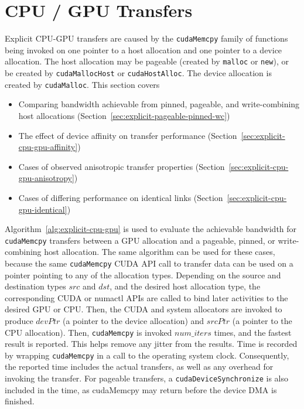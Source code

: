 \section{CPU / GPU Transfers}
\label{sec:explicit-cpu-gpu}

Explicit CPU-GPU transfers are caused by the \texttt{cudaMemcpy} family of functions being invoked on one pointer to a host allocation and one pointer to a device allocation.
The host allocation may be pageable (created by \texttt{malloc} or \texttt{new}), or be created by \texttt{cudaMallocHost} or \texttt{cudaHostAlloc}.
The device allocation is created by \texttt{cudaMalloc}.
This section covers
\begin{itemize}
	\item Comparing bandwidth achievable from pinned, pageable, and write-combining host allocations (Section~\ref{sec:explicit-pageable-pinned-wc})
	\item The effect of device affinity on transfer performance (Section~\ref{sec:explicit-cpu-gpu-affinity})
	\item Cases of observed anisotropic transfer properties (Section~\ref{sec:explicit-cpu-gpu-anisotropy})
	\item Cases of differing performance on identical links (Section~\ref{sec:explicit-cpu-gpu-identical})
\end{itemize}

Algorithm~\ref{alg:explicit-cpu-gpu} is used to evaluate the achievable bandwidth for \texttt{cudaMemcpy} transfers between a GPU allocation and a pageable, pinned, or write-combining host allocation. 
The same algorithm can be used for these cases, because the same \texttt{cudaMemcpy} CUDA API call to transfer data can be used on a pointer pointing to any of the allocation types.
Depending on the source and destination types $src$ and $dst$, and the desired host allocation type, the corresponding CUDA or numactl APIs are called to bind later activities to the desired GPU or CPU.
Then, the CUDA and system allocators are invoked to produce $devPtr$ (a pointer to the device allocation) and $srcPtr$ (a pointer to the CPU allocation).
Then, \texttt{cudaMemcpy} is invoked $num\_iters$ times, and the fastest result is reported.
This helps remove any jitter from the results.
Time is recorded by wrapping \texttt{cudaMemcpy} in a call to the operating system clock.
Consequently, the reported time includes the actual transfers, as well as any overhead for invoking the transfer.
For pageable transfers, a \texttt{cudaDeviceSynchronize} is also included in the time, as cudaMemcpy may return before the device DMA is finished.


